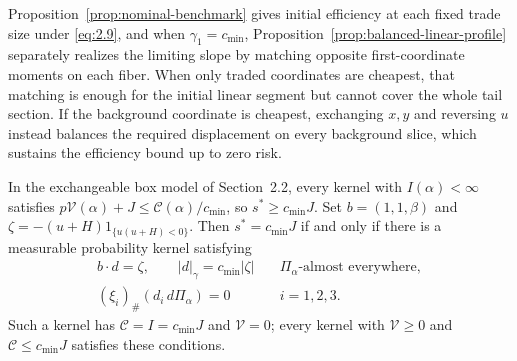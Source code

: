 Proposition~\ref{prop:nominal-benchmark} gives initial efficiency at each fixed trade size under \eqref{eq:2.9}, and when \(\gamma_1=c_{\min}\), Proposition~\ref{prop:balanced-linear-profile} separately realizes the limiting slope by matching opposite first-coordinate moments on each fiber. When only traded coordinates are cheapest, that matching is enough for the initial linear segment but cannot cover the whole tail section. If the background coordinate is cheapest, exchanging \(x,y\) and reversing \(u\) instead balances the required displacement on every background slice, which sustains the efficiency bound up to zero risk.

\begin{lemma}\label{lem:efficiency-bound}
In the exchangeable box model of Section~2.2, every kernel with \(I(\alpha)<\infty\) satisfies \(p\mathcal V(\alpha)+J\le\mathcal C(\alpha)/c_{\min}\), so \(s^*\ge c_{\min}J\). Set \(b=(1,1,\beta)\) and \(\zeta=-(u+H)1_{\{u(u+H)<0\}}\). Then \(s^*=c_{\min}J\) if and only if there is a measurable probability kernel satisfying
\begin{equation}
\begin{aligned}
b\cdot d=\zeta,\qquad |d|_\gamma=c_{\min}|\zeta|
&\quad\Pi_\alpha\text{-almost everywhere},\\
(\xi_i)_\#(d_i\,d\Pi_\alpha)=0
&\quad i=1,2,3.
\end{aligned}
\tag{4.1}\label{eq:4.1}
\end{equation}
Such a kernel has \(\mathcal C=I=c_{\min}J\) and \(\mathcal V=0\); every kernel with \(\mathcal V\ge0\) and \(\mathcal C\le c_{\min}J\) satisfies these conditions.
\end{lemma}

